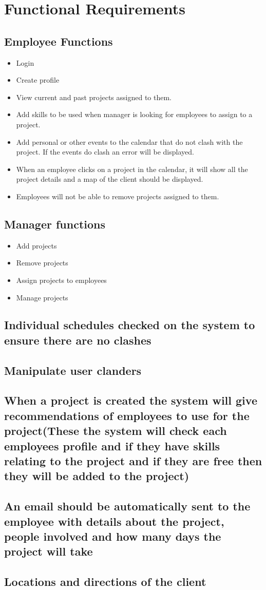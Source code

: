 \documentclass{article}
\begin{document}
\section{Functional Requirements}
	\subsection{Employee Functions}
		\begin{itemize}
			\item Login
			\item Create profile
			\item View current and past projects assigned to them. 
			\item Add skills to be used when manager is looking for employees to assign to a project.
			\item Add personal or other events to the calendar that do not clash with the project. If the events do clash an error will be displayed.  
			\item When an employee clicks on a project in the calendar, it will show all the project details and a map of the client should be displayed.
			\item Employees will not be able to remove projects assigned to them.
		\end{itemize}
	\subsection{Manager functions}
		\begin{itemize}
			\item Add projects
			\item Remove projects
			\item Assign projects to employees
			\item Manage projects
		\end{itemize}
	\subsection{Individual schedules checked on the system to ensure there are no clashes}
	\subsection{Manipulate user clanders}
	\subsection{When a project is created the system will give recommendations of employees to use for the project(These the system will check each employees profile and if they have skills relating to the project and if they are free then they will be added to the project)}
	\subsection{An email should be automatically sent to the employee with details about the project, people involved and how many days the project will take}
	\subsection{Locations and directions of the client}
\end{document}
